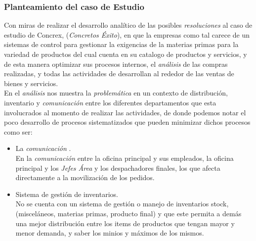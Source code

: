 \documentclass[12pt]{article}
\begin{document}
\subsubsection{ Planteamiento del caso de Estudio }

\vspace{.25cm}
\begin{center}
\begin{minipage}{14cm}

  Con miras de realizar el desarrollo analítico de las 
  posibles \textit{ resoluciones } al caso de estudio de Concrex,
  (\textit{Concretos Éxito}), en que la empresas como tal carece de un 
  sistemas de control para gestionar la exigencias de la materias primas 
  para la variedad de productos del cual cuenta en su catalogo de productos 
  y servicios, y de esta manera optimizar sus procesos internos, 
  el \textit{ análisis } de las compras realizadas, y todas las actividades 
  de desarrollan al rededor de las ventas de bienes y servicios.\\

  En el \textit{ análisis } nos muestra la \textit{problemática} en un
  contexto de distribución, inventario y \textit{ comunicación } entre los
  diferentes departamentos que esta involucrados al momento de realizar 
  las actividades, de donde podemos notar el poco desarrollo de 
  procesos sistematizados que pueden minimizar dichos procesos como ser:

  \begin{itemize}
    \item La \textit{ comunicación }.\\
      En la \textit{comunicación} entre la oficina principal y sus empleados,
      la oficina principal y los \textit{Jefes Área} y los despachadores
      finales, los que afecta directamente a la movilización de los pedidos.
    \item Sistema de gestión de inventarios. \\
      No se cuenta con un sistema de gestión o manejo de inventarios stock,
      (misceláneos, materias primas, producto final) y que este permita a
      demás una mejor distribución entre los items de productos que tengan 
      mayor y menor demanda, y saber los minios y máximos de los mismos.

  \end{itemize}
  

\end{minipage}
\end{center}
\end{document}
